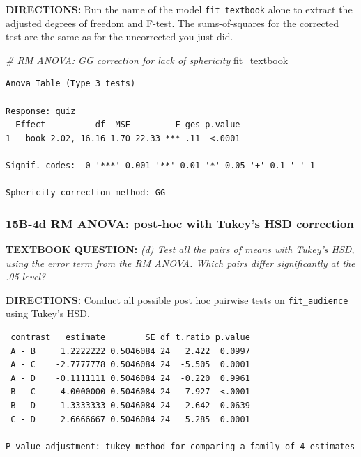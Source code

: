 \documentclass[]{article}
\newenvironment{Shaded}{\begin{snugshade}}{\end{snugshade}}
\newcommand{\KeywordTok}[1]{\textcolor[rgb]{0.13,0.29,0.53}{\textbf{#1}}}
\newcommand{\DataTypeTok}[1]{\textcolor[rgb]{0.13,0.29,0.53}{#1}}
\newcommand{\StringTok}[1]{\textcolor[rgb]{0.31,0.60,0.02}{#1}}
\newcommand{\CommentTok}[1]{\textcolor[rgb]{0.56,0.35,0.01}{\textit{#1}}}
\newcommand{\OperatorTok}[1]{\textcolor[rgb]{0.81,0.36,0.00}{\textbf{#1}}}
\newcommand{\NormalTok}[1]{#1}
\begin{document}
\textbf{DIRECTIONS:} Run the name of the model \texttt{fit\_textbook}
alone to extract the adjusted degrees of freedom and F-test. The
sums-of-squares for the corrected test are the same as for the
uncorrected you just did.

\begin{Shaded}
\begin{Highlighting}[]
\CommentTok{# RM ANOVA: GG correction for lack of sphericity}
\NormalTok{fit_textbook}
\end{Highlighting}
\end{Shaded}

\begin{verbatim}
Anova Table (Type 3 tests)

Response: quiz
  Effect          df  MSE         F ges p.value
1   book 2.02, 16.16 1.70 22.33 *** .11  <.0001
---
Signif. codes:  0 '***' 0.001 '**' 0.01 '*' 0.05 '+' 0.1 ' ' 1

Sphericity correction method: GG 
\end{verbatim}

\clearpage

\subsubsection{15B-4d RM ANOVA: post-hoc with Tukey's HSD
correction}\label{b-4d-rm-anova-post-hoc-with-tukeys-hsd-correction}

\textbf{TEXTBOOK QUESTION:} \emph{(d) Test all the pairs of means with
Tukey's HSD, using the error term from the RM ANOVA. Which pairs differ
significantly at the .05 level?}

\textbf{DIRECTIONS:} Conduct all possible post hoc pairwise tests on
\texttt{fit\_audience} using Tukey's HSD.

\begin{Shaded}
\end{Shaded}

\begin{verbatim}
 contrast   estimate        SE df t.ratio p.value
 A - B     1.2222222 0.5046084 24   2.422  0.0997
 A - C    -2.7777778 0.5046084 24  -5.505  0.0001
 A - D    -0.1111111 0.5046084 24  -0.220  0.9961
 B - C    -4.0000000 0.5046084 24  -7.927  <.0001
 B - D    -1.3333333 0.5046084 24  -2.642  0.0639
 C - D     2.6666667 0.5046084 24   5.285  0.0001

P value adjustment: tukey method for comparing a family of 4 estimates 
\end{verbatim}
\end{document}
